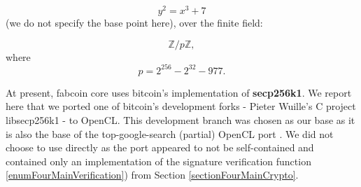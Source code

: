 \documentclass{article}
\newcommand{\secpTwoFiveSixKone}{{\bf secp256k1}}
\begin{document}
\[
y^2 = x^3 + 7
\]
(we do not specify the base point here), over the finite field:

\[
\mathbb Z / p\mathbb Z, 
\]
where
\begin{equation}\label{eqThePrime}
p= 2^{256} - 2^{32} - 977.
\end{equation}

At present, fabcoin core uses bitcoin's implementation of \secpTwoFiveSixKone{}. We report here that we ported one of bitcoin's development forks - Pieter Wuille's C project libsecp256k1 \cite{Wuille:secp256k1}  - to OpenCL. This development branch was chosen as our base as it is also the base of the top-google-search (partial) OpenCL port \cite{secp256k1:openCLimplementationHanh0}. We did not choose to use \cite{secp256k1:openCLimplementationHanh0} directly as the port appeared to not be self-contained and contained only an implementation of the signature verification function \ref{enumFourMainVerification})  from Section \ref{sectionFourMainCrypto}.




\end{document}
